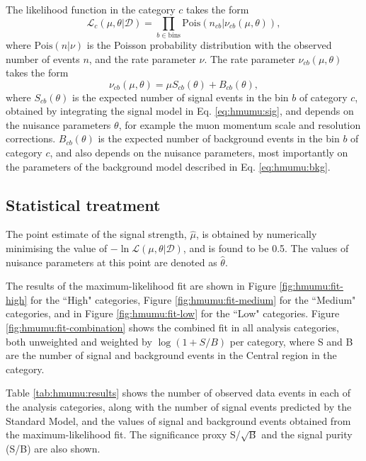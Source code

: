 The likelihood function in the category $c$ takes the form
\begin{equation}
\mathcal{L}_c (\mu, \theta | \mathcal{D}) =
\prod_{b \in \text{bins}} \text{Pois}(n_{cb} | \nu_{cb} (\mu, \theta)),
\end{equation}
where $\text{Pois}(n | \nu)$ is the Poisson probability distribution
with the observed number of events $n$, and the rate parameter $\nu$.
The rate parameter $\nu_{cb}(\mu, \theta)$ takes the form
\begin{equation}
\nu_{cb}(\mu, \theta) = \mu S_{cb}(\theta) + B_{cb}(\theta),
\end{equation}
where $S_{cb}(\theta)$ is the expected number of signal events in
the bin $b$ of category $c$, obtained by integrating the signal
model in Eq. \ref{eq:hmumu:sig}, and depends on the nuisance
parameters $\theta$, for example the muon momentum scale
and resolution corrections. $B_{cb}(\theta)$ is the expected
number of background events in the bin $b$ of category $c$, and
also depends on the nuisance parameters, most importantly on the
parameters of the background model described in Eq. \ref{eq:hmumu:bkg}.

\subsection{Statistical treatment}

The point estimate of the signal strength, $\hat\mu$, is obtained
by numerically minimising the value of $-\ln{\mathcal{L}}(\mu, \theta | \mathcal{D})$,
and is found to be 0.5. The values of nuisance parameters at this
point are denoted as $\hat\theta$.

The results of the maximum-likelihood fit are shown in Figure
\ref{fig:hmumu:fit-high} for the ``High" categories, Figure
\ref{fig:hmumu:fit-medium} for the ``Medium" categories,
and in Figure \ref{fig:hmumu:fit-low} for the ``Low" categories.
Figure \ref{fig:hmumu:fit-combination} shows the combined fit in
all analysis categories, both unweighted and weighted by
$\log(1+S/B)$ per category, where S and B are the number of signal
and background events in the Central region in the category.

Table \ref{tab:hmumu:results} shows the number of observed data events
in each of the analysis categories, along with the number of signal events
predicted by the Standard Model, and the values of signal and background
events obtained from the maximum-likelihood fit. The significance proxy
S/$\sqrt{\text{B}}$ and the signal purity (S/B) are also shown.

